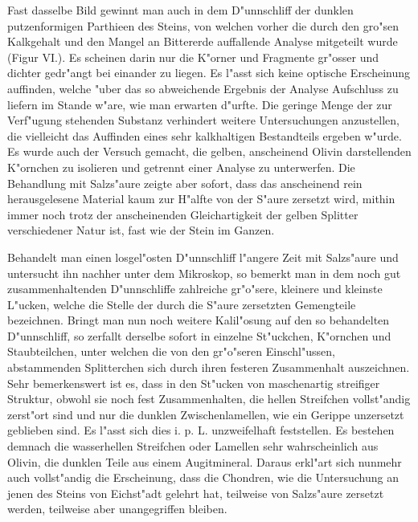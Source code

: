 \documentclass[a4paper, 11pt, oneside]{article}
\begin{document}
Fast dasselbe Bild gewinnt man auch in dem D"unnschliff der dunklen putzenformigen Parthieen des Steins, von welchen vorher die durch den gro"sen Kalkgehalt und den Mangel an Bittererde auffallende Analyse mitgeteilt wurde (Figur VI.). Es scheinen darin nur die K"orner und Fragmente gr"osser und dichter gedr"angt bei einander zu liegen. Es l"asst sich keine optische Erscheinung auffinden, welche "uber das so abweichende Ergebnis der Analyse Aufschluss zu liefern im Stande w"are, wie man erwarten d"urfte. Die geringe Menge der zur Verf"ugung stehenden Substanz verhindert weitere Untersuchungen anzustellen, die vielleicht das Auffinden eines sehr kalkhaltigen Bestandteils ergeben w"urde. Es wurde auch der Versuch gemacht, die gelben, anscheinend Olivin darstellenden K"ornchen zu isolieren und getrennt einer Analyse zu unterwerfen. Die Behandlung mit Salzs"aure zeigte aber sofort, dass das anscheinend rein herausgelesene Material kaum zur H"alfte von der S"aure zersetzt wird, mithin immer noch trotz der anscheinenden Gleichartigkeit der gelben Splitter verschiedener Natur ist, fast wie der Stein im Ganzen.

Behandelt man einen losgel"osten D"unnschliff l"angere Zeit mit Salzs"aure und untersucht ihn nachher unter dem Mikroskop, so bemerkt man in dem noch gut zusammenhaltenden D"unnschliffe zahlreiche gr"o"sere, kleinere und kleinste L"ucken, welche die Stelle der durch die S"aure zersetzten Gemengteile bezeichnen. Bringt man nun noch weitere Kalil"osung auf den so behandelten D"unnschliff, so zerfallt derselbe sofort in einzelne St"uckchen, K"ornchen und Staubteilchen, unter welchen die von den gr"o"seren Einschl"ussen, abstammenden Splitterchen sich durch ihren festeren Zusammenhalt auszeichnen. Sehr bemerkenswert ist es, dass in den St"ucken von maschenartig streifiger Struktur, obwohl sie noch fest Zusammenhalten, die hellen Streifchen vollst"andig zerst"ort sind und nur die dunklen Zwischenlamellen, wie ein Gerippe unzersetzt geblieben sind. Es l"asst sich dies i. p. L. unzweifelhaft feststellen. Es bestehen demnach die wasserhellen Streifchen oder Lamellen sehr wahrscheinlich aus Olivin, die dunklen Teile aus einem Augitmineral. Daraus erkl"art sich nunmehr auch vollst"andig die Erscheinung, dass die Chondren, wie die Untersuchung an jenen des Steins von Eichst"adt gelehrt hat, teilweise von Salzs"aure zersetzt werden, teilweise aber unangegriffen bleiben.
\end{document}
